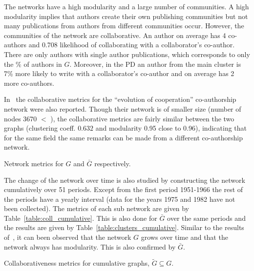 \documentclass{article}
\theoremstyle{definition}
\newcommand{\authors}{}
\newcommand{\isolated}{}
\newcommand{\isolatedpercentage}{}
\begin{document}
The networks have a high modularity and a large number of communities.
A high modularity implies that authors create their own publishing communities
but not many publications from authors from different communities occur.
However, the communities of the network are collaborative.
An author on average has 4 co-authors and 0.708 likelihood of collaborating
with a collaborator's co-author. There are only \isolated authors with single
author publications, which corresponds to only the \isolatedpercentage\% of authors
in \(G\). Moreover, in the PD an author from the main cluster is 7\% more
likely to write with a collaborator's co-author and on average has 2 more
co-authors.

In~\cite{Liu2015} the collaborative metrics for the ``evolution of cooperation''
co-authorship network were also reported. Though their network is of smaller
size (number of nodes 3670 \(<\) \authors), the collaborative metrics are fairly
similar between the two graphs (clustering coeff. \(0.632\) and modularity 0.95
close to 0.96), indicating that for the same field the same remarks can be made
from a different co-authorship network.

\begin{table}[!hbtp]
    \centering
    \resizebox{\textwidth}{!}{
    }
    \caption{Network metrics for \(G\) and \(\bar{G}\) respectively.}
    \label{table:network_comparison.tex}
\end{table}

The change of the network over time is also studied by constructing the network
cumulatively over 51 periods. Except from the first period 1951-1966 the rest of
the periods have a yearly interval (data for the years 1975 and 1982 have not
been collected). The metrics of each sub network are given by
Table~\ref{table:coll_cumulative}. This is also done for \(\bar{G}\) over the
same periods and the results are given by Table~\ref{table:clusters_cumulative}.
Similar to the results of~\cite{Liu2015}, it can been observed that the network
\(G\) grows over time and that the network always has modularity. This is also
confirmed by \(\bar{G}\).

\begin{table}[!hbtp]
    \centering
    \resizebox{\textwidth}{!}{
    }
    \caption{Collaborativeness metrics for cumulative graphs, \(\tilde{G} \subseteq G\).}\label{table:coll_cumulative}
\end{table}
\end{document}
